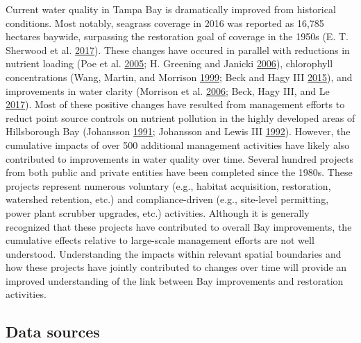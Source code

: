 \documentclass[]{article}
\begin{document}
Current water quality in Tampa Bay is dramatically improved from
historical conditions. Most notably, seagrass coverage in 2016 was
reported as 16,785 hectares baywide, surpassing the restoration goal of
coverage in the 1950s (E. T. Sherwood et al.
\protect\hyperlink{ref-Sherwood17}{2017}). These changes have occured in
parallel with reductions in nutrient loading (Poe et al.
\protect\hyperlink{ref-Poe05}{2005}; H. Greening and Janicki
\protect\hyperlink{ref-Greening06}{2006}), chlorophyll concentrations
(Wang, Martin, and Morrison \protect\hyperlink{ref-Wang99}{1999}; Beck
and Hagy III \protect\hyperlink{ref-Beck15}{2015}), and improvements in
water clarity (Morrison et al. \protect\hyperlink{ref-Morrison06}{2006};
Beck, Hagy III, and Le \protect\hyperlink{ref-Beck17c}{2017}). Most of
these positive changes have resulted from management efforts to reduct
point source controls on nutrient pollution in the highly developed
areas of Hillsborough Bay (Johansson
\protect\hyperlink{ref-Johansson91}{1991}; Johansson and Lewis III
\protect\hyperlink{ref-Johansson92}{1992}). However, the cumulative
impacts of over 500 additional management activities have likely also
contributed to improvements in water quality over time. Several hundred
projects from both public and private entities have been completed since
the 1980s. These projects represent numerous voluntary (e.g., habitat
acquisition, restoration, watershed retention, etc.) and
compliance-driven (e.g., site-level permitting, power plant scrubber
upgrades, etc.) activities. Although it is generally recognized that
these projects have contributed to overall Bay improvements, the
cumulative effects relative to large-scale management efforts are not
well understood. Understanding the impacts within relevant spatial
boundaries and how these projects have jointly contributed to changes
over time will provide an improved understanding of the link between Bay
improvements and restoration activities.

\subsection{Data sources}\label{data-sources}
\end{document}
